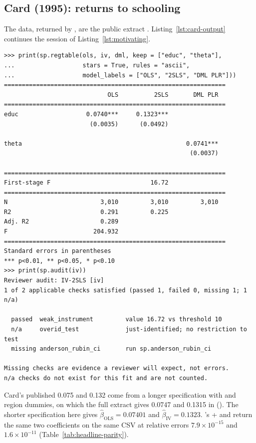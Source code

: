 \subsection{Card (1995): returns to schooling}\label{sec:ex-card}

The data, returned by , are the public
extract  \citep{shea2024wooldridge}.
Listing~\ref{lst:card-output} continues the session of
Listing~\ref{lst:motivating}.

\begin{lstlisting}[float=tb,caption={The session of
Listing~\ref{lst:motivating}, continued: two result classes render into
one table, and \code{sp.audit} separates the checks this fit has passed,
still lacks, or cannot have.},label={lst:card-output},captionpos=b]
>>> print(sp.regtable(ols, iv, dml, keep = ["educ", "theta"],
...                   stars = True, rules = "ascii",
...                   model_labels = ["OLS", "2SLS", "DML PLR"]))
==============================================================
                             OLS          2SLS       DML PLR
==============================================================
educ                   0.0740***     0.1323***
                        (0.0035)      (0.0492)

theta                                              0.0741***
                                                    (0.0037)

==============================================================
First-stage F                            16.72
==============================================================
N                          3,010         3,010         3,010
R2                         0.291         0.225
Adj. R2                    0.289
F                        204.932
==============================================================
Standard errors in parentheses
*** p<0.01, ** p<0.05, * p<0.10
>>> print(sp.audit(iv))
Reviewer audit: IV-2SLS [iv]
1 of 2 applicable checks satisfied (passed 1, failed 0, missing 1; 1 n/a)

  passed  weak_instrument         value 16.72 vs threshold 10
  n/a     overid_test             just-identified; no restriction to test
  missing anderson_rubin_ci       run sp.anderson_rubin_ci

Missing checks are evidence a reviewer will expect, not errors.
n/a checks do not exist for this fit and are not counted.
\end{lstlisting}

Card's published 0.075 and 0.132 come from a longer specification with
 and region dummies, on which the full extract gives 0.0747
and 0.1315 in  (). The shorter specification here gives
\(\hat\beta_{\mathrm{OLS}} = 0.07401\) and
\(\hat\beta_{\mathrm{IV}} = 0.1323\). 's
+ and  return the same two
coefficients on the same CSV at relative errors
\(7.9\times 10^{-15}\) and \(1.6\times 10^{-11}\)
(Table~\ref{tab:headline-parity}).

